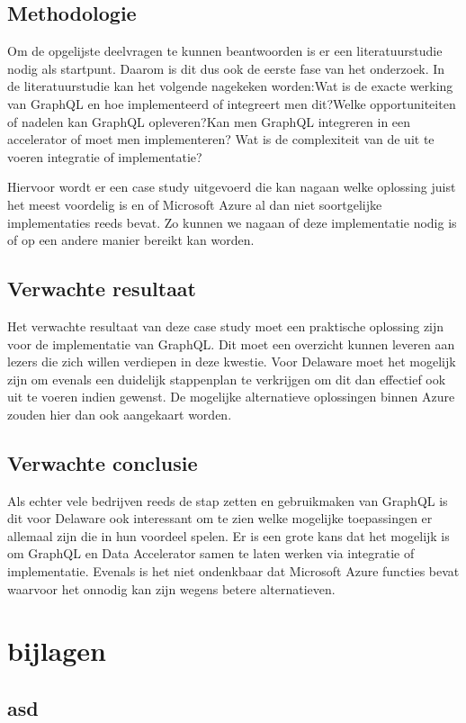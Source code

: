 \section{Methodologie}%
\label{sec:methodologie}

Om de opgelijste deelvragen te kunnen beantwoorden is er een literatuurstudie nodig als startpunt. Daarom is dit dus ook de eerste fase van het onderzoek. In de literatuurstudie kan het volgende nagekeken worden:\newline Wat is de exacte werking van GraphQL en hoe implementeerd of integreert men dit?\newline Welke opportuniteiten of nadelen kan GraphQL opleveren?\newline Kan men GraphQL integreren in een accelerator of moet men implementeren? \newline Wat is de complexiteit van de uit te voeren integratie of implementatie?

Hiervoor wordt er een case study uitgevoerd die kan nagaan welke oplossing juist het meest voordelig is en of Microsoft Azure al dan niet soortgelijke implementaties reeds bevat. Zo kunnen we nagaan of deze implementatie nodig is of op een andere manier bereikt kan worden.

\section{Verwachte resultaat}
\label{sec:verwachte resultaat}
Het verwachte resultaat van deze case study moet een praktische oplossing zijn voor de implementatie van GraphQL. Dit moet een overzicht kunnen leveren aan lezers die zich willen verdiepen in deze kwestie. Voor Delaware moet het mogelijk zijn om evenals een duidelijk stappenplan te verkrijgen om dit dan effectief ook uit te voeren indien gewenst. De mogelijke alternatieve oplossingen binnen Azure zouden hier dan ook aangekaart worden.

\section{Verwachte conclusie}
\label{sec:verwachte conclusiet}
Als echter vele bedrijven reeds de stap zetten en gebruikmaken van GraphQL is dit voor Delaware ook interessant om te zien welke mogelijke toepassingen er allemaal zijn die in hun voordeel spelen. Er is een grote kans dat het mogelijk is om GraphQL en Data Accelerator samen te laten werken via integratie of implementatie. Evenals is het niet ondenkbaar dat Microsoft Azure functies bevat waarvoor het onnodig kan zijn wegens betere alternatieven.


\chapter{bijlagen}
\section{asd}%
\label{sec:asd}